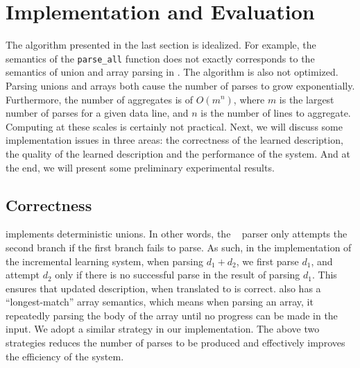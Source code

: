\section{Implementation and Evaluation}
\label{sec:imp}
The algorithm presented in the last section is idealized.
For example, the semantics of the {\tt parse\_all} function does not
exactly corresponds to the semantics of union and array parsing in \pads 
\cite{fisher+:popl06}. The algorithm is also not optimized.
Parsing unions and arrays both cause the number of parses to 
grow exponentially. Furthermore, the number of aggregates is of 
$O(m ^ n)$, where $m$ is the largest
number of parses for a given data line, and $n$ is the number of lines to aggregate.
Computing at these scales is certainly not practical.
Next, we will discuss some implementation issues in three areas: the correctness of the
learned description, the quality of the learned description and the performance of
the system. And at the end, we will present some preliminary experimental results.

\subsection{Correctness}
\pads{} implements deterministic unions. In other words, the \pads~ parser
only attempts the second branch if the first branch fails to parse. As
such, in the implementation of the incremental learning system, when parsing
$d_1 + d_2$, we first parse $d_1$, and attempt $d_2$ only if there is no
successful parse in the result of parsing $d_1$. This ensures that
updated description, when translated to \pads{} is correct. 
\pads{} also has a ``longest-match'' array semantics, which means when parsing
an array, it repeatedly parsing the body of the array until no progress can be made 
in the input. We adopt a similar strategy in our implementation.
The above two strategies reduces the number of parses to be produced and 
effectively improves the efficiency of the system. 

